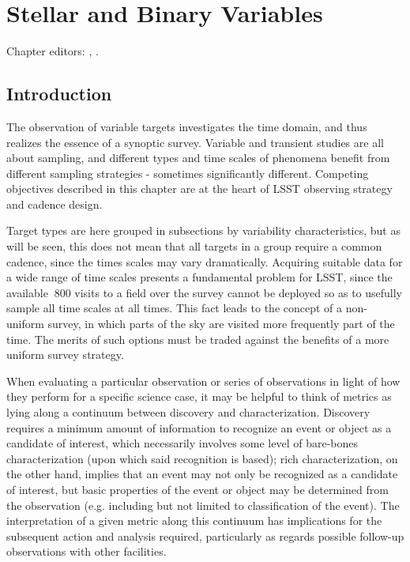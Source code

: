 
\chapter[Stellar and Binary Variables]{Stellar and Binary Variables}
\def\chpname{variables}\label{chp:\chpname}

Chapter editors:
,
.




\section{Introduction}

The observation of variable targets investigates the time domain, and
thus realizes the essence of a synoptic survey.  Variable and
transient studies are all about sampling, and different types and time
scales of phenomena benefit from different sampling strategies -
sometimes significantly different.  Competing objectives described in
this chapter are at the heart of LSST observing strategy and cadence
design.

Target types are here grouped in subsections by variability
characteristics, but as will be seen, this does not mean that all
targets in a group require a common cadence, since the times scales
may vary dramatically.  Acquiring suitable data for a wide range of
time scales presents a fundamental problem for LSST, since the
available $~$800 visits to a field over the survey cannot be deployed
so as to usefully sample all time scales at all times.  This fact
leads to the concept of a non-uniform survey, in which parts of the
sky are visited more frequently part of the time.  The merits of such
options must be traded against the benefits of a more uniform survey
strategy.

When evaluating a particular observation or series of observations in
light of how they perform for a specific science case, it may be
helpful to think of metrics as lying along a continuum between
discovery and characterization. Discovery requires a minimum amount of
information to recognize an event or object as a candidate of
interest, which necessarily involves some level of bare-bones
characterization (upon which said recognition is based); rich
characterization, on the other hand, implies that an event may not
only be recognized as a candidate of interest, but basic properties of
the event or object may be determined from the observation (e.g.
including but not limited to classification of the event). The
interpretation of a given metric along this continuum has implications
for the subsequent action and analysis required, particularly as
regards possible follow-up observations with other facilities.








